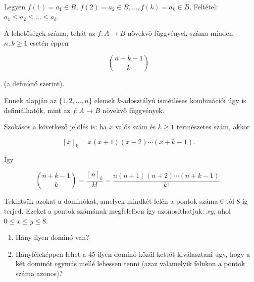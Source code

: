 \begin{solution}
Legyen $f(1)=a_{1}\in B$, $f(2)=a_{2}\in B,\dots,f(k)=a_{k}\in B$.
Feltétel: $a_{1}\leq a_{2}\leq\dots\leq a_{k}$.

A lehetőségek száma, tehát az $f:A\to B$ növekvő függvények száma
minden $n,k\geq1$ esetén éppen

\[
\binom{n+k-1}{k}
\]

(a definíció szerint).

Ennek alapján az $\{1,2,\dots,n\}$ elemek $k$-adosztályú ismétléses
kombinációi úgy is definiálhatók, mint az $f:A\to B$ növekvő függvények.

Szokásos a következő jelölés is: ha $x$ valós szám és $k\geq1$ természetes
szám, akkor

\[
[x]_{k}=x(x+1)(x+2)\cdots(x+k-1).
\]

Így

\[
\binom{n+k-1}{k}=\frac{[n]_{k}}{k!}=\frac{n(n+1)(n+2)\cdots(n+k-1)}{k!}.
\]
\end{solution}
\begin{extraproblem}
Tekintsük azokat a dominókat, amelyek mindkét felén a pontok száma
0-tól 8-ig terjed. Ezeket a pontok számának megfelelően így azonosíthatjuk:
$xy$, ahol $0\leq x\leq y\leq8$.
\begin{enumerate}
\item Hány ilyen dominó van?
\item Hányféleképpen lehet a 45 ilyen dominó közül kettőt kiválasztani úgy,
hogy a két dominót egymás mellé lehessen tenni (azaz valamelyik felükön
a pontok száma azonos)?
\end{enumerate}
\end{extraproblem}


